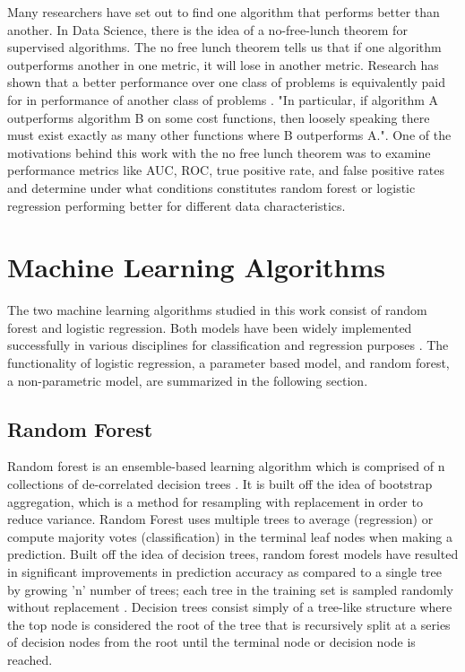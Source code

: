 \documentclass{llncs}
\begin{document}
Many researchers have set out to find one algorithm that performs better than another. In Data Science, there is the idea of a no-free-lunch theorem for supervised algorithms. The no free lunch theorem tells us that if one algorithm outperforms another in one metric, it will lose in another metric. Research has shown that a better performance over one class of problems is equivalently paid for in performance of another class of problems \cite{wolper}. "In particular, if algorithm A outperforms algorithm B on some cost functions, then loosely speaking there must exist exactly as many other functions where B outperforms A."\cite{wolper}. One of the motivations behind this work with the no free lunch theorem was to examine performance metrics like AUC, ROC, true positive rate, and false positive rates and determine under what conditions constitutes random forest or logistic regression performing better for different data characteristics.

\section{Machine Learning Algorithms}

The two machine learning algorithms studied in this work consist of random forest and logistic regression. Both models have been widely implemented successfully in various disciplines for classification and regression purposes \cite{couronne}. The functionality of logistic regression, a parameter based model, and random forest, a non-parametric model, are summarized in the following section. 

\subsection{Random Forest}

Random forest is an ensemble-based learning algorithm which is comprised of n collections of de-correlated decision trees \cite{hastie}. It is built off the idea of bootstrap aggregation, which is a method for resampling with replacement in order to reduce variance. Random Forest uses multiple trees to average (regression) or compute majority votes (classification) in the terminal leaf nodes when making a prediction. Built off the idea of decision trees, random forest models have resulted in significant improvements in prediction accuracy as compared to a single tree by growing 'n' number of trees; each tree in the training set is sampled randomly without replacement \cite{breiman}. Decision trees consist simply of a tree-like structure where the top node is considered the root of the tree that is recursively split at a series of decision nodes from the root until the terminal node or decision node is reached. 
\end{document}
